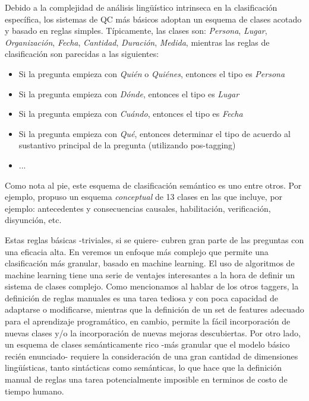 Debido a la complejidad de análisis lingüístico intrinseca en la clasificación específica, los sistemas de QC más básicos adoptan un esquema de clases acotado y basado en reglas simples. Típicamente, las clases son: \textit{Persona}, \textit{Lugar}, \textit{Organización}, \textit{Fecha}, \textit{Cantidad}, \textit{Duración}, \textit{Medida}, mientras las reglas de clasificación son parecidas a las siguientes:
\begin{itemize}
\item Si la pregunta empieza con \textit{Quién} o \textit{Quiénes}, entonces el tipo es \textit{Persona}
\item Si la pregunta empieza con \textit{Dónde}, entonces el tipo es \textit{Lugar}
\item Si la pregunta empieza con \textit{Cuándo}, entonces el tipo es \textit{Fecha}
\item Si la pregunta empieza con \textit{Qué}, entonces determinar el tipo de acuerdo al sustantivo principal de la pregunta (utilizando pos-tagging)
\item ...
\end{itemize}

Como nota al pie, este esquema de clasificación semántico es uno entre otros. Por ejemplo, \cite{QC-other} propuso un esquema \textit{conceptual} de 13 clases en las que incluye, por ejemplo: antecedentes y consecuencias causales, habilitación, verificación, disyunción, etc.

Estas reglas básicas -triviales, si se quiere- cubren gran parte de las preguntas con una eficacia alta. En  veremos un enfoque más complejo que permite una clasificación más granular, basado en machine learning. El uso de algoritmos de machine learning tiene una serie de ventajes interesantes a la hora de definir un sistema de clases complejo. Como mencionamos al hablar de los otros taggers, la definición de reglas manuales es una tarea tediosa y con poca capacidad de adaptarse o modificarse, mientras que la definición de un set de features adecuado para el aprendizaje programático, en cambio, permite la fácil incorporación de nuevas clases y/o la incorporación de nuevas mejoras descubiertas. Por otro lado, un esquema de clases semánticamente rico -más granular que el modelo básico recién enunciado- requiere la consideración de una gran cantidad de dimensiones lingüísticas, tanto sintácticas como semánticas, lo que hace que la definición manual de reglas una tarea potencialmente imposible en terminos de costo de tiempo humano. 

